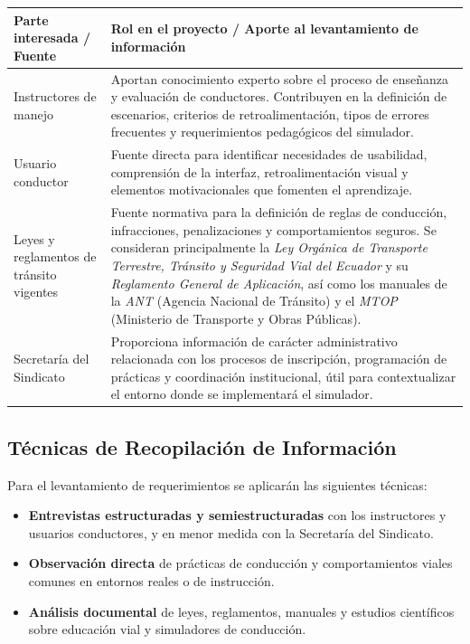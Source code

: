 \documentclass[12pt]{article}
\begin{document}
\begin{center}
\begin{tabular}{|p{5cm}|p{12cm}|}
\hline
\textbf{Parte interesada / Fuente} & \textbf{Rol en el proyecto / Aporte al levantamiento de información} \\
\hline
Instructores de manejo & Aportan conocimiento experto sobre el proceso de enseñanza y evaluación de conductores. Contribuyen en la definición de escenarios, criterios de retroalimentación, tipos de errores frecuentes y requerimientos pedagógicos del simulador. \\
\hline
Usuario conductor & Fuente directa para identificar necesidades de usabilidad, comprensión de la interfaz, retroalimentación visual y elementos motivacionales que fomenten el aprendizaje. \\
\hline
Leyes y reglamentos de tránsito vigentes & Fuente normativa para la definición de reglas de conducción, infracciones, penalizaciones y comportamientos seguros. Se consideran principalmente la \textit{Ley Orgánica de Transporte Terrestre, Tránsito y Seguridad Vial del Ecuador} y su \textit{Reglamento General de Aplicación}, así como los manuales de la \textit{ANT} (Agencia Nacional de Tránsito) y el \textit{MTOP} (Ministerio de Transporte y Obras Públicas). \\
\hline
Secretaría del Sindicato & Proporciona información de carácter administrativo relacionada con los procesos de inscripción, programación de prácticas y coordinación institucional, útil para contextualizar el entorno donde se implementará el simulador. \\
\hline
\end{tabular}
\end{center}

\subsection{Técnicas de Recopilación de Información}
Para el levantamiento de requerimientos se aplicarán las siguientes técnicas:
\begin{itemize}
    \item \textbf{Entrevistas estructuradas y semiestructuradas} con los instructores y usuarios conductores, y en menor medida con la Secretaría del Sindicato.
    \item \textbf{Observación directa} de prácticas de conducción y comportamientos viales comunes en entornos reales o de instrucción.
    \item \textbf{Análisis documental} de leyes, reglamentos, manuales y estudios científicos sobre educación vial y simuladores de conducción.
\end{itemize}
\end{document}
